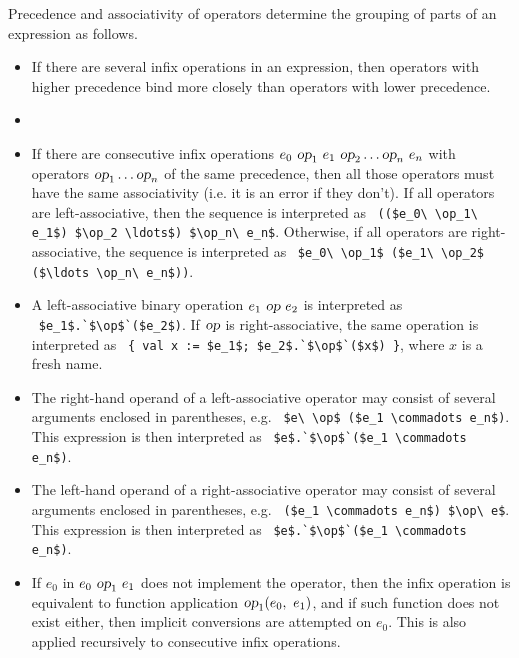 Precedence and associativity of operators determine the grouping of parts of an expression as follows.

\begin{itemize}
  \item If there are several infix operations in an expression, then operators with higher precedence bind more closely than operators with lower precedence. 
  
  \item 

  \item If there are consecutive infix operations $e_0\ \mbox{\sl op}_1\ e_1\ \mbox{\sl op}_2 \ldots \mbox{\sl op}_n\ e_n$ with operators $\mbox{\sl op}_1 \ldots \mbox{\sl op}_n$ of the same precedence, then all those operators must have the same associativity (i.e. it is an error if they don't). If all operators are left-associative, then the sequence is interpreted as ~\lstinline!(($e_0\ \op_1\ e_1$) $\op_2 \ldots$) $\op_n\ e_n$!. Otherwise, if all operators are right-associative, the sequence is interpreted as ~\lstinline!$e_0\ \op_1$ ($e_1\ \op_2$ ($\ldots \op_n\ e_n$))!.

  \item A left-associative binary operation $e_1\ \mbox{\sl op}\ e_2$ is interpreted as ~\lstinline!$e_1$.`$\op$`($e_2$)!. If $\mbox{\sl op}$ is right-associative, the same operation is interpreted as ~\lstinline!{ val x := $e_1$; $e_2$.`$\op$`($x$) }!, where $x$ is a fresh name. 

  \item The right-hand operand of a left-associative operator may consist of several arguments enclosed in parentheses, e.g. ~\lstinline!$e\ \op$ ($e_1 \commadots e_n$)!. This expression is then interpreted as ~\lstinline!$e$.`$\op$`($e_1 \commadots e_n$)!. 

  \item The left-hand operand of a right-associative operator may consist of several arguments enclosed in parentheses, e.g. ~\lstinline!($e_1 \commadots e_n$) $\op\ e$!. This expression is then interpreted as ~\lstinline!$e$.`$\op$`($e_1 \commadots e_n$)!. 
  
  \item If $e_0$ in $e_0\ \mbox{\sl op}_1\ e_1$ does not implement the operator, then the infix operation is equivalent to function application $\mbox{\sl op}_1(e_0,\ e_1)$, and if such function does not exist either, then implicit conversions are attempted on $e_0$. This is also applied recursively to consecutive infix operations. 
\end{itemize}






